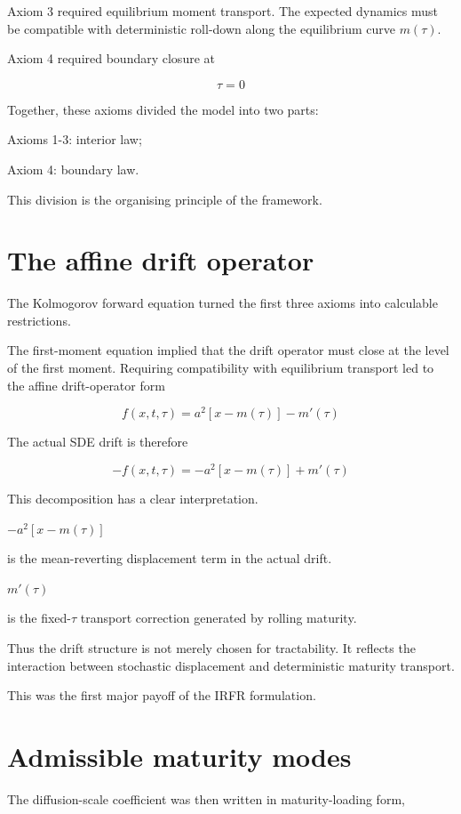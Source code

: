 \documentclass[11pt,oneside]{book}
\begin{document}
Axiom 3 required equilibrium moment transport. The expected dynamics
must be compatible with deterministic roll-down along the equilibrium
curve $m(\tau)$.

Axiom 4 required boundary closure at

\[
\tau=0
\]

Together, these axioms divided the model into two parts:

Axioms 1-3: interior law;

Axiom 4: boundary law.

This division is the organising principle of the framework.

\section{The affine drift operator}\label{the-affine-drift-operator}

The Kolmogorov forward equation turned the first three axioms into
calculable restrictions.

The first-moment equation implied that the drift operator must close at
the level of the first moment. Requiring compatibility with equilibrium
transport led to the affine drift-operator form

\[
f(x,t,\tau)=a^2[x-m(\tau)]-m'(\tau)
\]

The actual SDE drift is therefore

\[
-f(x,t,\tau) = -a^2[x-m(\tau)] + m'(\tau)
\]

This decomposition has a clear interpretation.

$-a^2[x-m(\tau)]$

is the mean-reverting displacement term in the actual drift.

$m'(\tau)$

is the fixed-$\tau$ transport correction generated by rolling maturity.

Thus the drift structure is not merely chosen for tractability. It
reflects the interaction between stochastic displacement and
deterministic maturity transport.

This was the first major payoff of the IRFR formulation.

\section{Admissible maturity modes}\label{admissible-maturity-modes}

The diffusion-scale coefficient was then written in maturity-loading
form,
\end{document}
